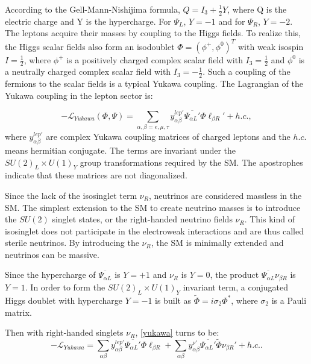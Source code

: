 According to the Gell-Mann-Nishijima formula, $Q=I_3+\frac{1}{2}Y$, where Q is the electric charge and Y is the hypercharge. For $\Psi_L$, $Y=-1$ and for $\Psi_R$, $Y=-2$. The leptons acquire their masses by coupling to the Higgs fields. To realize this, the Higgs scalar fields also form an isodoublet $\Phi = (\phi^+,\phi^0)^T$ with weak isospin $I=\frac{1}{2}$, where $\phi^+$ is a positively charged complex scalar field with $I_3=\frac{1}{2}$ and $\phi^0$ is a neutrally charged complex scalar field with $I_3=-\frac{1}{2}$. Such a coupling of the fermions to the scalar fields is a typical Yukawa coupling. The Lagrangian of the Yukawa coupling in the lepton sector is\cite{funchal2013physics}:

\begin{equation}\label{yukawa}
-\mathcal L_{Yukawa}(\Phi,\Psi) =\sum_{\alpha,\beta=e,\mu,\tau} y^{lep'}_{\alpha\beta} \overline{\Psi_{\alpha L}'}\Phi\ell_{\beta R}' + h.c.,
\end{equation}
where $y^{lep'}_{\alpha\beta}$ are complex Yukawa coupling matrices of charged leptons and the $h.c.$ means hermitian conjugate. The terms are invariant under the $SU(2)_L\times U(1)_Y$ group transformations required by the SM. The apostrophes indicate that these matrices are not diagonalized.

Since the lack of the isosinglet term $\nu_R$, neutrinos are considered massless in the SM. The simplest extension to the SM to create neutrino masses is to introduce the $SU(2)$ singlet states, or the right-handed neutrino fields $\nu_R$. This kind of isosinglet does not participate in the electroweak interactions and are thus called sterile neutrinos. By introducing the $\nu_R$, the SM is minimally extended and neutrinos can be massive\cite{giunti2007fundamentals}.

Since the hypercharge of $\overline{\Psi_{\alpha L}}$ is $Y=+1$ and $\nu_R$ is $Y=0$, the product $\overline{\Psi_{\alpha L}}\nu_{\beta R}$ is $Y=1$. In order to form the $SU(2)_L\times U(1)_Y$ invariant term, a conjugated Higgs doublet with hypercharge $Y=-1$ is built as $\widetilde{\Phi}=i\sigma_2\Phi^*$, where $\sigma_2$ is a Pauli matrix\cite{giunti2007fundamentals}.

Then with right-handed singlets $\nu_R$, \ref{yukawa} turns to be\cite{giunti2007fundamentals,funchal2013physics}:
\begin{equation}\label{yukawa2}
-\mathcal{L}_{Yukawa} =  \sum_{\alpha\beta} y^{lep'}_{\alpha\beta} \overline{\Psi_{\alpha L}'}\Phi\ell_{\beta R} + \sum_{\alpha\beta} y^{\nu'}_{\alpha\beta} \overline{\Psi_{\alpha L}'}\widetilde{\Phi}\nu_{\beta R}'+h.c..
\end{equation}

